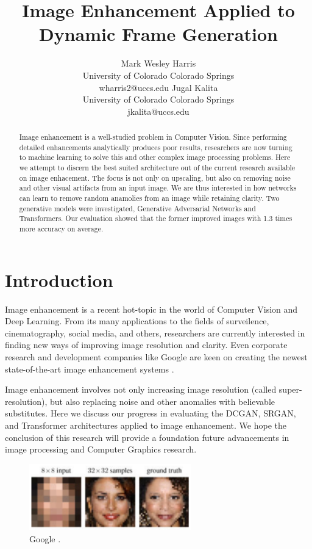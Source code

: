 \documentclass[letterpaper]{article} %
\title{Image Enhancement Applied to Dynamic Frame Generation}
\author{Mark Wesley Harris\\ %
University of Colorado Colorado Springs\\
wharris2@uccs.edu %
\And
Jugal Kalita\\
University of Colorado Colorado Springs\\
jkalita@uccs.edu
}
\begin{document}
\maketitle

\begin{abstract}
Image enhancement is
a well-studied problem in Computer Vision.
Since performing detailed enhancements analytically produces poor results,
researchers are now turning to machine learning to solve
this and other complex image processing problems.
Here we attempt to discern the best suited architecture out of the current research available
on image enhacement.
The focus is not only on upscaling, but also on removing noise and other visual artifacts from an input image.
We are thus interested in how networks can learn to remove random anamolies from an image
while retaining clarity.
Two generative models were investigated,
Generative Adversarial Networks and Transformers.
Our evaluation showed that the former improved images with 1.3 times more accuracy on average.
\end{abstract}

\section{Introduction}
Image enhancement is a recent hot-topic in the world of Computer Vision
and Deep Learning. From its many applications to the
fields of surveilence, cinematography, social media, and others,
researchers are currently interested
in finding new ways of improving image resolution and clarity.
Even corporate research and development companies like Google are keen on creating the newest
state-of-the-art image enhancement systems \cite{google}.

Image enhancement involves not only increasing image resolution
(called super-resolution), but also replacing noise and other anomalies with
believable substitutes.
Here we discuss our progress in evaluating
the DCGAN, SRGAN, and Transformer architectures
applied to image enhancement.
We hope the conclusion of this research will
provide a foundation
future advancements in image processing
and Computer Graphics research.

\begin{figure}[htbp]
\centerline{\includegraphics[width=7cm]{google.png}}
\caption{Google \cite{google}.}
\label{fig:google}
\end{figure}
\end{document}
